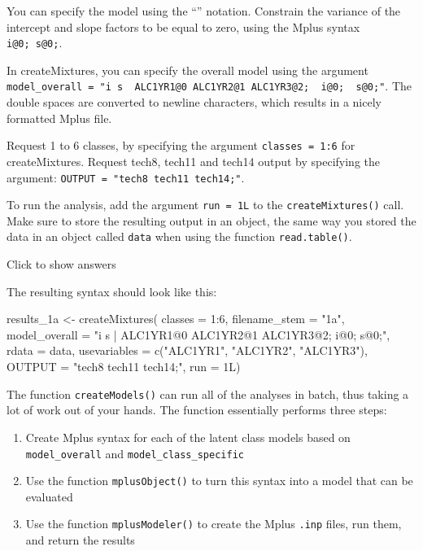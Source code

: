 \documentclass[
]{book}
\newenvironment{Shaded}{\begin{snugshade}}{\end{snugshade}}
\newcommand{\AttributeTok}[1]{\textcolor[rgb]{0.77,0.63,0.00}{#1}}
\newcommand{\DecValTok}[1]{\textcolor[rgb]{0.00,0.00,0.81}{#1}}
\newcommand{\FunctionTok}[1]{\textcolor[rgb]{0.00,0.00,0.00}{#1}}
\newcommand{\NormalTok}[1]{#1}
\newcommand{\OtherTok}[1]{\textcolor[rgb]{0.56,0.35,0.01}{#1}}
\newcommand{\SpecialCharTok}[1]{\textcolor[rgb]{0.00,0.00,0.00}{#1}}
\newcommand{\StringTok}[1]{\textcolor[rgb]{0.31,0.60,0.02}{#1}}
\providecommand{\tightlist}{%
  \setlength{\itemsep}{0pt}\setlength{\parskip}{0pt}}
\begin{document}
You can specify the model using the ``\textbar{}'' notation. Constrain the variance of the intercept and slope factors to be equal to zero, using the Mplus syntax \texttt{i@0;\ s@0;}.

In createMixtures, you can specify the overall model using the argument \texttt{model\_overall\ =\ "i\ s\ \textbar{}\ ALC1YR1@0\ ALC1YR2@1\ ALC1YR3@2;\ \ i@0;\ \ s@0;"}. The double spaces are converted to newline characters, which results in a nicely formatted Mplus file.

Request 1 to 6 classes, by specifying the argument \texttt{classes\ =\ 1:6} for createMixtures. Request tech8, tech11 and tech14 output by specifying the argument: \texttt{OUTPUT\ =\ "tech8\ tech11\ tech14;"}.

To run the analysis, add the argument \texttt{run\ =\ 1L} to the \texttt{createMixtures()} call.
Make sure to store the resulting output in an object, the same way you stored the data in an object called \texttt{data} when using the function \texttt{read.table()}.

Click to show answers

The resulting syntax should look like this:

\begin{Shaded}
\begin{Highlighting}[]
\NormalTok{results\_1a }\OtherTok{\textless{}{-}} \FunctionTok{createMixtures}\NormalTok{(}
  \AttributeTok{classes =} \DecValTok{1}\SpecialCharTok{:}\DecValTok{6}\NormalTok{,}
  \AttributeTok{filename\_stem =} \StringTok{"1a"}\NormalTok{,}
  \AttributeTok{model\_overall =} \StringTok{"i s | ALC1YR1@0 ALC1YR2@1 ALC1YR3@2;}
\StringTok{                   i@0;  s@0;"}\NormalTok{,}
  \AttributeTok{rdata =}\NormalTok{ data, }
  \AttributeTok{usevariables =} \FunctionTok{c}\NormalTok{(}\StringTok{"ALC1YR1"}\NormalTok{, }\StringTok{"ALC1YR2"}\NormalTok{, }\StringTok{"ALC1YR3"}\NormalTok{),}
  \AttributeTok{OUTPUT =} \StringTok{"tech8 tech11 tech14;"}\NormalTok{,}
  \AttributeTok{run =}\NormalTok{ 1L)}
\end{Highlighting}
\end{Shaded}

The function \texttt{createModels()} can run all of the analyses in batch, thus taking a lot of work out of your hands.
The function essentially performs three steps:

\begin{enumerate}
\def\labelenumi{\arabic{enumi}.}
\tightlist
\item
  Create Mplus syntax for each of the latent class models based on \texttt{model\_overall} and \texttt{model\_class\_specific}
\item
  Use the function \texttt{mplusObject()} to turn this syntax into a model that can be evaluated
\item
  Use the function \texttt{mplusModeler()} to create the Mplus \texttt{.inp} files, run them, and return the results
\end{enumerate}
\end{document}
